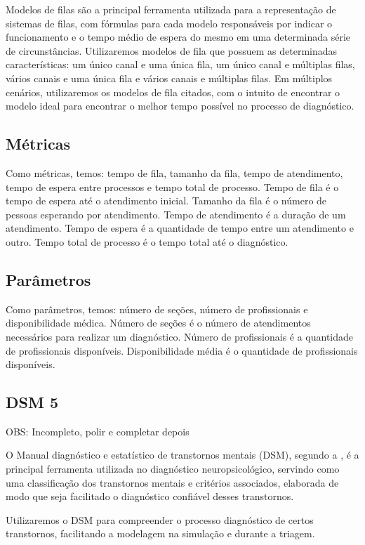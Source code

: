 \documentclass[
    12pt,                %
    openright,           %
    oneside,             %
    a4paper,             %
    english,             %
    brazil               %
]{abntex2}
\begin{document}
Modelos de filas são a principal ferramenta utilizada para a representação de sistemas de filas, com fórmulas para cada modelo responsáveis por indicar o funcionamento e o tempo médio de espera do mesmo em uma determinada série de circunstâncias. Utilizaremos modelos de fila que possuem as determinadas características: um único canal e uma única fila, um único canal e múltiplas filas, vários canais e uma única fila e vários canais e múltiplas filas. Em múltiplos cenários, utilizaremos os modelos de fila citados, com o intuito de encontrar o modelo ideal para encontrar o melhor tempo possível no processo de diagnóstico.

\subsection{Métricas}

Como métricas, temos: tempo de fila, tamanho da fila, tempo de atendimento, tempo de espera entre processos e tempo total de processo. Tempo de fila é o tempo de espera até o atendimento inicial. Tamanho da fila é o número de pessoas esperando por atendimento. Tempo de atendimento é a duração de um atendimento. Tempo de espera é a quantidade de tempo entre um atendimento e outro. Tempo total de processo é o tempo total até o diagnóstico. 

\subsection{Parâmetros}

Como parâmetros, temos: número de seções, número de profissionais e disponibilidade médica. Número de seções é o número de atendimentos necessários para realizar um diagnóstico. Número de profissionais é a quantidade de profissionais disponíveis. Disponibilidade média é o quantidade de profissionais disponíveis.

\subsection{DSM 5}
OBS: Incompleto, polir e completar depois

O Manual diagnóstico e estatístico de transtornos mentais (DSM), segundo a , é a principal ferramenta utilizada no diagnóstico neuropsicológico, servindo como uma classificação dos transtornos mentais e critérios associados, elaborada de modo que seja facilitado o diagnóstico confiável desses transtornos.

Utilizaremos o DSM para compreender o processo diagnóstico de certos transtornos, facilitando a modelagem na simulação e durante a triagem.
\end{document}

